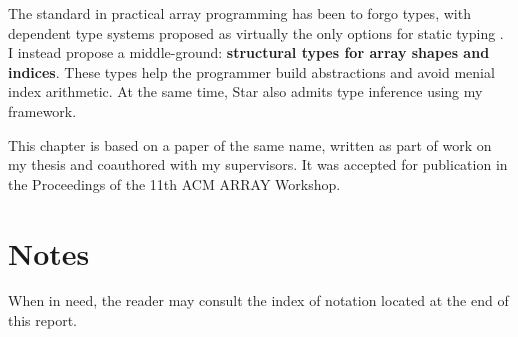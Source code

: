 The standard in practical array programming has been to forgo types, with dependent type systems proposed as virtually the only options for static typing \cite{dex}. I instead propose a middle-ground: \textbf{structural types for array shapes and indices}. These types help the programmer build abstractions and avoid menial index arithmetic. At the same time, Star also admits type inference using my framework.

This chapter is based on a paper of the same name, written as part of work on my thesis and coauthored with my supervisors. It was accepted for publication in the Proceedings of the 11th ACM ARRAY Workshop. 

\section*{Notes}

When in need, the reader may consult the index of notation located at the end of this report.